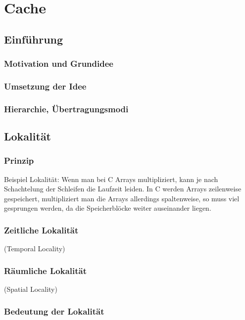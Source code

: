 \section{Cache}
\subsection{Einführung}
\subsubsection{Motivation und Grundidee}

\subsubsection{Umsetzung der Idee}

\subsubsection{Hierarchie, Übertragungsmodi}

\subsection{Lokalität}
\subsubsection{Prinzip}
Beispiel Lokalität: Wenn man bei C Arrays multipliziert, kann je nach Schachtelung der Schleifen die Laufzeit leiden. In C werden Arrays zeilenweise gespeichert, multipliziert man die Arrays allerdings spaltenweise, so muss viel gesprungen werden, da die Speicherblöcke weiter auseinander liegen.

\subsubsection{Zeitliche Lokalität}
(Temporal Locality)

\subsubsection{Räumliche Lokalität}
(Spatial Locality)

\subsubsection{Bedeutung der Lokalität}

